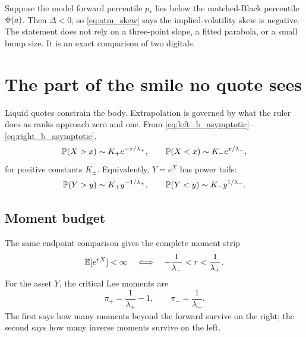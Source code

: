 \documentclass[11pt]{article}
\begin{document}
\begin{example}[title={The digital explains skew before any regression does}]
Suppose the model forward percentile $p_*$ lies below the matched-Black
percentile $\Phi(a)$.  Then $\Delta<0$, so
\eqref{eq:atm_skew} says the implied-volatility skew is negative.  The
statement does not rely on a three-point slope, a fitted parabola, or a small
bump size.  It is an exact comparison of two digitals.
\end{example}

\section{The part of the smile no quote sees}
\label{sec:tails}

Liquid quotes constrain the body.  Extrapolation is governed by what the ruler
does as ranks approach zero and one.  From
\eqref{eq:left_b_asymptotic}--\eqref{eq:right_b_asymptotic},
\begin{equation}
\mathbb{P}(X>x)\sim K_+e^{-x/\lambda_+},\qquad
\mathbb{P}(X<x)\sim K_-e^{x/\lambda_-},
\label{eq:x_tail_probs}
\end{equation}
for positive constants $K_\pm$.  Equivalently, $Y=e^X$ has power tails:
\begin{equation}
\mathbb{P}(Y>y)\sim K_+y^{-1/\lambda_+},\qquad
\mathbb{P}(Y<y)\sim K_-y^{1/\lambda_-}.
\label{eq:y_tail_probs}
\end{equation}

\subsection{Moment budget}

The same endpoint comparison gives the complete moment strip
\begin{equation}
\mathbb{E}[e^{rX}]<\infty
\quad\Longleftrightarrow\quad
-\frac{1}{\lambda_-}<r<\frac{1}{\lambda_+}.
\label{eq:moment_strip}
\end{equation}
For the asset $Y$, the critical Lee moments are
\begin{equation}
\pi_+=\frac{1}{\lambda_+}-1,\qquad
\pi_-=\frac{1}{\lambda_-}.
\label{eq:critical_moments}
\end{equation}
The first says how many moments beyond the forward survive on the right; the
second says how many inverse moments survive on the left.
\end{document}
